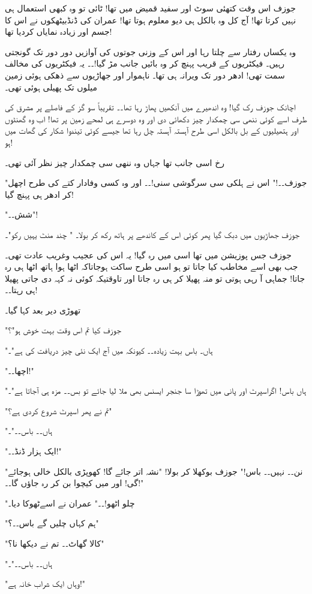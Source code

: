 جوزف اس وقت کتھئی سوٹ اور سفید قمیض میں تھا! ٹائی تو وہ کبھی استعمال ہی نہیں کرتا تھا! آج کل وہ بالکل ہی دیو معلوم ہوتا تھا! عمران کی ڈنڈبیٹھکوں نے اس کا جسم اور زیادہ نمایاں کردیا تھا!

وہ یکساں رفتار سے چلتا رہا اور اس کے وزنی جوتوں کی آوازیں دور دور تک گونجتی رہیں۔ فیکٹریوں کے قریب پہنچ کر وہ بائیں جانب مڑ گیا!۔۔ یہ فیکٹریوں کی مخالف سمت تھی! ادھر دور تک ویرانہ ہی تھا۔ ناہموار اور جھاڑیوں سے ذھکی ہوئی زمین میلوں تک پھیلی ہوئی تھی۔

اچانک جوزف رک گیا! وہ اندھیرے میں آنکھیں پھاڑ رہا تھا۔۔ تقریباً سو گز کے فاصلے پر مشرق کی طرف اسے کوئی ننھی سی چمکدار چیز دکھائی دی اور وہ دوسرے ہی لمحے زمین پر تھا! اب وہ گھنٹوں اور ہتھیلیوں کے بل بالکل اسی طرح آہستہ آہستہ چل رہا تھا جیسے کوئی تیندوا شکار کی گھات میں ہو!

رخ اسی جانب تھا جہاں وہ ننھی سی چمکدار چیز نظر آئی تھی۔

"جوزف۔۔!" اس نے ہلکی سی سرگوشی سنی!۔۔ اور وہ کسی وفادار کتے کی طرح اچھل کر ادھر ہی پہنچ گیا!

"شش۔۔"!

جوزف جھاڑیوں میں دبک گیا پھر کوئی اس کے کاندھے پر ہاتھ رکھ کر بولا۔ " چند منٹ یہیں رکو"۔

جوزف جس پوزیشن میں تھا اسی میں رہ گیا! یہ اس کی عجیب وغریب عادت تھی۔ جب بھی اسے مخاطب کیا جاتا تو ہو اسی طرح ساکت ہوجاتاکہ اٹھا ہوا ہاتھ اٹھا ہی رہ جاتا! جماہی آ رہی ہوتی تو منہ پھیلا کر ہی رہ جاتا اور تاوقتیکہ کوئی نہ کہہ دی جاتی پھیلا ہی رہتا۔۔!

تھوڑی دیر بعد کہا گیا۔

"جوزف کیا تم اس وقت بہت خوش ہو"؟

"ہاں۔ باس بہت زیادہ۔۔ کیونکہ میں آج ایک نئی چیز دریافت کی ہے"۔

"اچھا۔۔!"

"ہاں باس! اگراسپرٹ اور پانی میں تھوڑا سا جنجر ایسنس بھی ملا لیا جائے تو بس۔۔ مزہ ہی آجاتا ہے"۔

"تم نے پھر اسپرٹ شروع کردی ہے؟"

"ہاں۔۔ باس۔۔"۔

"ایک ہزار ڈنڈ۔۔!"

"نن۔۔ نہیں۔۔ باس!" جوزف بوکھلا کر بولا! "نشہ اتر جائے گا! کھوپڑی بالکل خالی ہوجائے گی! اور میں کیچوا بن کر رہ جاؤں گا۔۔!"

"چلو اٹھو!۔۔" عمران نے اسےٹھوکا دیا۔

"ہم کہاں چلیں گے باس۔۔؟"

"کالا گھاٹ۔۔ تم نے دیکھا نا؟"

"ہاں۔۔ باس۔۔"۔

"وہاں ایک شراب خانہ ہے!"


